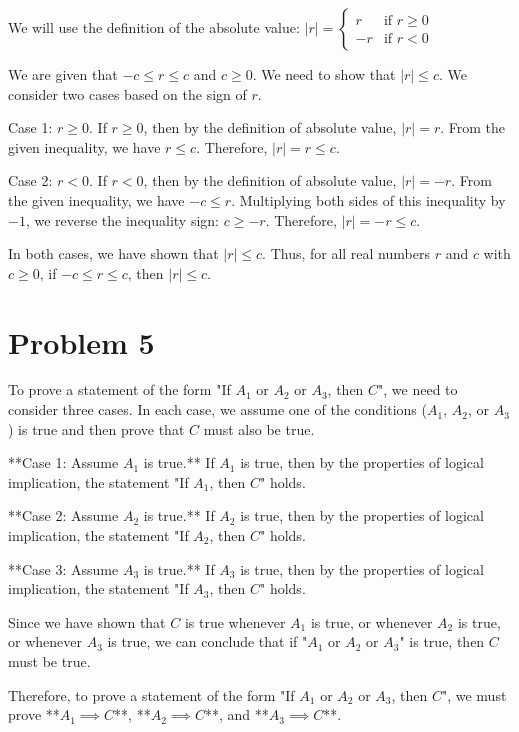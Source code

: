 \documentclass{article}
\begin{document}
We will use the definition of the absolute value:
$|r| = \begin{cases} r & \text{if } r \ge 0 \\ -r & \text{if } r < 0 \end{cases}$

We are given that $-c \le r \le c$ and $c \ge 0$. We need to show that $|r| \le c$. We consider two cases based on the sign of $r$.

Case 1: $r \ge 0$.
If $r \ge 0$, then by the definition of absolute value, $|r| = r$.
From the given inequality, we have $r \le c$.
Therefore, $|r| = r \le c$.

Case 2: $r < 0$.
If $r < 0$, then by the definition of absolute value, $|r| = -r$.
From the given inequality, we have $-c \le r$.
Multiplying both sides of this inequality by $-1$, we reverse the inequality sign:
$c \ge -r$.
Therefore, $|r| = -r \le c$.

In both cases, we have shown that $|r| \le c$. Thus, for all real numbers $r$ and $c$ with $c \ge 0$, if $-c \le r \le c$, then $|r| \le c$.

\newpage

\section*{Problem 5}
To prove a statement of the form "If $A_1$ or $A_2$ or $A_3$, then $C$", we need to consider three cases. In each case, we assume one of the conditions ($A_1$, $A_2$, or $A_3$) is true and then prove that $C$ must also be true.

**Case 1: Assume $A_1$ is true.**
If $A_1$ is true, then by the properties of logical implication, the statement "If $A_1$, then $C$" holds.

**Case 2: Assume $A_2$ is true.**
If $A_2$ is true, then by the properties of logical implication, the statement "If $A_2$, then $C$" holds.

**Case 3: Assume $A_3$ is true.**
If $A_3$ is true, then by the properties of logical implication, the statement "If $A_3$, then $C$" holds.

Since we have shown that $C$ is true whenever $A_1$ is true, or whenever $A_2$ is true, or whenever $A_3$ is true, we can conclude that if "$A_1$ or $A_2$ or $A_3$" is true, then $C$ must be true.

Therefore, to prove a statement of the form "If $A_1$ or $A_2$ or $A_3$, then $C$", we must prove **$A_1 \implies C$**, **$A_2 \implies C$**, and **$A_3 \implies C$**.
\end{document}
